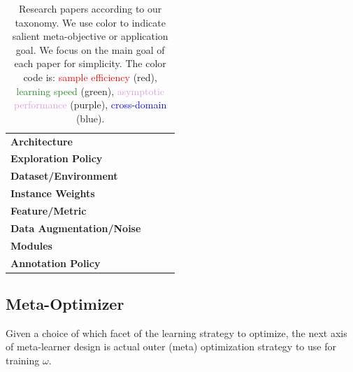 \documentclass[10pt,journal,compsoc]{IEEEtran}
\newcommand{\red}[1]{\textcolor{red}{#1}} %
\newcommand{\blue}[1]{\textcolor{blue}{#1}}
\newcommand{\green}[1]{\textcolor{ForestGreen}{#1}}
\newcommand{\purple}[1]{\textcolor{Plum}{#1}}
\begin{document}
\begin{table}[t]
{\begin{tabular}{ l | c c c }
\rowcolor{Gray}
 \textbf{Architecture} & \purple{\cite{liu2019darts}}\red{\cite{lian2020towards}} & \purple{\cite{zoph2016neural}} & \purple{\cite{real2018regularized}}\\

 \textbf{Exploration Policy} & & \red{\cite{zheng2018intrinsicrewardpg,xu2018metaexplore,stadie2018metaexplore,alet2020metacuriosity,garcia2019metamdp,gupta2018metaexplore}} & \\

 \rowcolor{Gray}
 \textbf{Dataset/Environment} & \red{\cite{wang2018datasetdistill}}\purple{\cite{weihong2019learn2impute}} & \blue{\cite{ruiz2019learn2sim}} & \blue{\cite{vuong2019howtorandomize}} \\

 \textbf{Instance Weights} & \purple{\cite{shu2019metaweightnet,ren2018l2rw,jiang2018mentornet}} & &\\

 \rowcolor{Gray}
 \textbf{Feature/Metric} & \red{\cite{vinyals2016matching,snell2017prototypicalnets,sung2018relationnet,garcia2018fewshot}} & &\\

 \textbf{Data Augmentation/Noise} & \purple{\cite{li2020dada}}\blue{\cite{tseng2020crossdomain}}\red{\cite{lee2020metadropout}} & \purple{\cite{cubuk2019autoaug}}&\purple{\cite{volpi2019learnaugment}}\\

 \rowcolor{Gray}
 \textbf{Modules} & \red{\cite{alet2018modularmetalearning,alet2019modularmeta}} & &\\
 \textbf{Annotation Policy} & \red{\cite{bachman2017laalicml,konyushkova2017learning}} & \blue{\cite{pang2018metatransferal}} &\\
 \hline

\end{tabular}
}
\caption{Research papers according to our taxonomy. We use color to indicate salient meta-objective or application goal. We focus on the main goal of each paper for simplicity. The color code is: \red{sample efficiency} (red), \green{learning speed} (green), \purple{asymptotic performance} (purple), \blue{cross-domain} (blue).}
\end{table}


\subsection{Meta-Optimizer}\label{sec:metaOpt}
Given a choice of which facet of the learning strategy to optimize, the next axis of meta-learner design is actual outer (meta) optimization strategy to use for training $\omega$.
\end{document}
